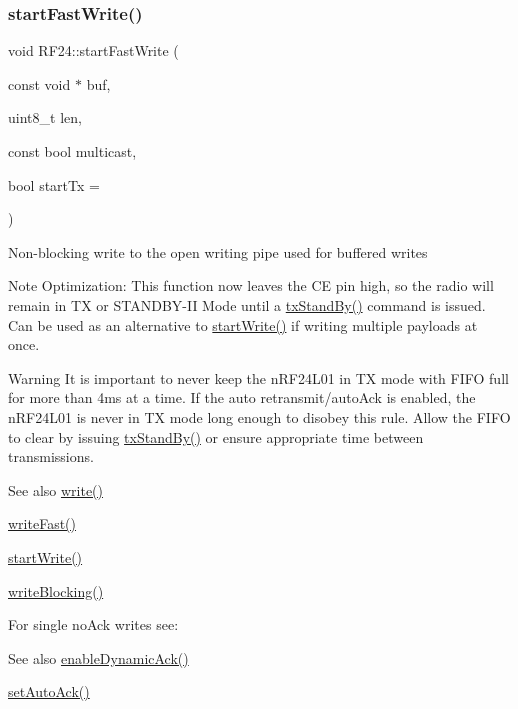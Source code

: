 \subsubsection{\texorpdfstring{start\+Fast\+Write()}{startFastWrite()}}
{\footnotesize\ttfamily void R\+F24\+::start\+Fast\+Write (\begin{DoxyParamCaption}\item[{const void $\ast$}]{buf,  }\item[{uint8\+\_\+t}]{len,  }\item[{const bool}]{multicast,  }\item[{bool}]{start\+Tx = {} }\end{DoxyParamCaption})}

Non-\/blocking write to the open writing pipe used for buffered writes

\begin{DoxyNote}{Note}
Optimization\+: This function now leaves the CE pin high, so the radio will remain in TX or S\+T\+A\+N\+D\+B\+Y-\/\+II Mode until a \hyperlink{classRF24_a12cc453453c94969d4d3f0edb3778c83}{tx\+Stand\+By()} command is issued. Can be used as an alternative to \hyperlink{classRF24_aa27519fc289920094422033e0bbf8cf9}{start\+Write()} if writing multiple payloads at once. 
\end{DoxyNote}
\begin{DoxyWarning}{Warning}
It is important to never keep the n\+R\+F24\+L01 in TX mode with F\+I\+FO full for more than 4ms at a time. If the auto retransmit/auto\+Ack is enabled, the n\+R\+F24\+L01 is never in TX mode long enough to disobey this rule. Allow the F\+I\+FO to clear by issuing \hyperlink{classRF24_a12cc453453c94969d4d3f0edb3778c83}{tx\+Stand\+By()} or ensure appropriate time between transmissions.
\end{DoxyWarning}
\begin{DoxySeeAlso}{See also}
\hyperlink{classRF24_a4cd4c198a47704db20b6b5cf0731cd58}{write()} 

\hyperlink{classRF24_a47b2516993481b58e724d1274a7fd9cb}{write\+Fast()} 

\hyperlink{classRF24_aa27519fc289920094422033e0bbf8cf9}{start\+Write()} 

\hyperlink{classRF24_ae6fd8d5ee490d54ae1cb2e8fefee535f}{write\+Blocking()}
\end{DoxySeeAlso}
For single no\+Ack writes see\+: \begin{DoxySeeAlso}{See also}
\hyperlink{classRF24_a6253607ac2a1995af91a35cea6899c31}{enable\+Dynamic\+Ack()} 

\hyperlink{classRF24_aec71746d59da978bcbb975167886a2cc}{set\+Auto\+Ack()}
\end{DoxySeeAlso}

